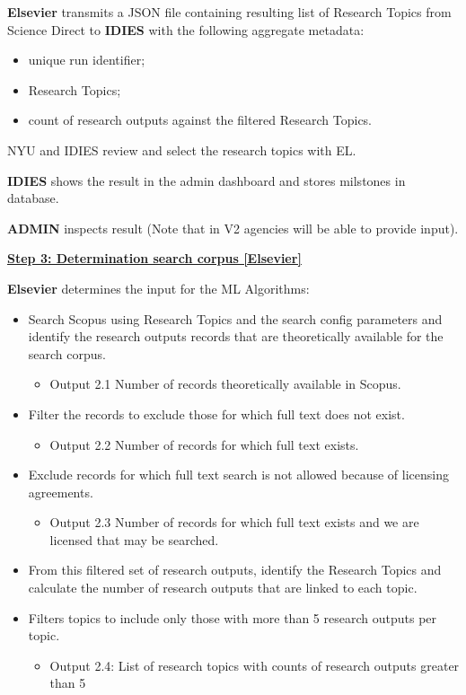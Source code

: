 \documentclass[titlepage, 11pt]{article}
\begin{document}
{\textbf{Elsevier} transmits a JSON file containing resulting list of Research Topics from Science Direct to \textbf{IDIES} with the following aggregate metadata:
\begin{itemize}
    \item unique run identifier;
    \item Research Topics;
    \item count of research outputs against the filtered Research Topics.
\end{itemize}

NYU and IDIES review and select the research topics with EL.

\textbf{IDIES} shows the result in the admin dashboard and stores milstones in database.

\textbf{ADMIN} inspects result (Note that in V2 agencies will be able to provide input).

\bigskip
\underline{\textbf{Step 3: Determination search corpus [Elsevier]}}

\textbf{Elsevier} determines the input for the ML Algorithms:
\begin{itemize}
    \item Search Scopus using Research Topics and the search config parameters and identify the research outputs records that are theoretically available for the search corpus. \begin{itemize}
        \item Output 2.1 Number of records theoretically available in Scopus.
    \end{itemize}
    \item Filter the records to exclude those for which full text does not exist.\begin{itemize}
        \item Output 2.2 Number of records for which full text exists.
    \end{itemize}
    \item Exclude records for which full text search is not allowed because of licensing agreements. \begin{itemize}
        \item Output 2.3 Number of records for which full text exists and we are licensed that may be searched. 
    \end{itemize}
    \item From this filtered set of research outputs, identify the Research Topics and calculate the number of research outputs that are linked to each topic.
    \item Filters topics to include only those with more than 5 research outputs per topic. 	\begin{itemize}
        \item Output 2.4: List of research topics with counts of research outputs greater than 5
    \end{itemize}
\end{itemize}

}
\end{document}

